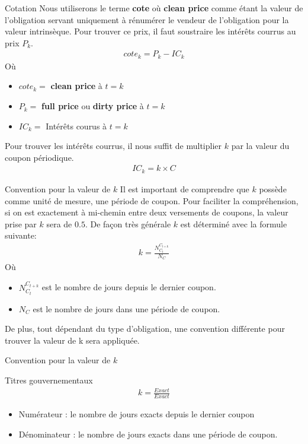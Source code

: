 \documentclass{beamer}
\begin{document}
\begin{frame}{Cotation}
Nous utiliserons le terme \textbf{cote} où \textbf{clean price} comme étant la valeur de l'obligation servant uniquement à rénumérer le vendeur de l'obligation pour la valeur intrinsèque. Pour trouver  ce prix, il faut soustraire les intérêts courrus au prix $P_k$.
\begin{align*}
cote_k=P_k-IC_k
\end{align*}
Où
\begin{itemize}
\item $cote_k=$ \textbf{clean price} à $t=k$
\item $P_k=$ \textbf{full price} ou \textbf{dirty price} à $t=k$
\item $IC_k=$ Intérêts courus à $t=k$
\end{itemize}

Pour trouver les intérêts courrus, il nous suffit de multiplier $k$ par la valeur du coupon périodique.
\begin{align*}
IC_k= k \times C
\end{align*}
\end{frame}

\begin{frame}{Convention pour la valeur de $k$}
Il est important de comprendre que $k$ possède comme unité de mesure, une période de coupon. Pour faciliter la compréhension, si on est exactement à mi-chemin entre deux versements de coupons, la valeur prise par $k$ sera de $0.5$. De façon très générale $k$ est déterminé avec la formule suivante:
\begin{align*}
k= \frac{N_{C_{t}}^{C_{t+k}}}{N_C}
\end{align*}
Où 
\begin{itemize}
\item $N_{C_{t}}^{C_{t+k}}$ est le nombre de jours depuis le dernier coupon. 
\item $N_C$ est le nombre de jours dans une période de coupon. 
\end{itemize}
\vspace{0.5cm}
De plus, tout dépendant du type d'obligation, une convention différente pour trouver la valeur de k sera appliquée.
\end{frame}

\begin{frame}{Convention pour la valeur de $k$}
\begin{block}{Titres gouvernementaux}
\begin{align*}
k=\frac{Exact}{Exact}
\end{align*}
\begin{itemize}
\item Numérateur : le nombre de jours exacts depuis le dernier coupon
\item Dénominateur : le nombre de jours exacts dans une période de coupon.
\end{itemize}
\end{block}
\end{frame}
\end{document}
